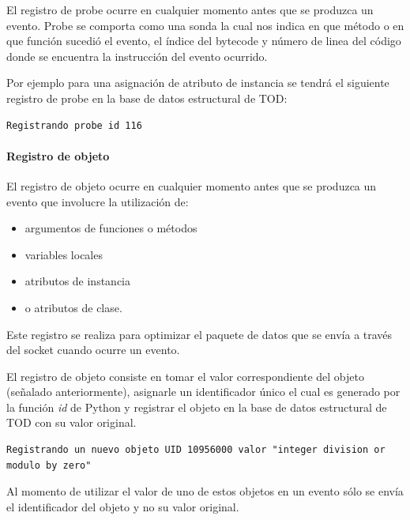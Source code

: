\documentclass[12pt,legalpaper]{report}
\begin{document}
El registro de probe ocurre en cualquier momento antes que se produzca un evento.  Probe se comporta como una sonda la cual nos indica en que método o en que función sucedió el evento, el índice del bytecode y número de linea del código donde se encuentra la instrucción del evento ocurrido.

Por ejemplo para una asignación de atributo de instancia se tendrá el siguiente registro de probe en la base de datos estructural de TOD:

\begin{singlespace}
\begin{lstlisting}[style=consola,numbers=none]
Registrando probe id 116
\end{lstlisting}
\end{singlespace}

				\paragraph{Registro de objeto}
				
El registro de objeto ocurre en cualquier momento antes que se produzca un evento que involucre la utilización de:
\begin{itemize}
	\item argumentos de funciones o métodos
	\item variables locales
	\item atributos de instancia
	\item o atributos de clase.  
\end{itemize}

Este registro se realiza para optimizar el paquete de datos que se envía a través del socket cuando ocurre un evento.

El registro de objeto consiste en tomar el valor correspondiente del objeto (señalado anteriormente), asignarle un identificador único el cual es generado por la función \textit{id} de Python y registrar el objeto en la base de datos estructural de TOD con su valor original.

\begin{singlespace}
\begin{lstlisting}[style=consola,numbers=none]
Registrando un nuevo objeto UID 10956000 valor "integer division or modulo by zero"
\end{lstlisting}
\end{singlespace}

Al momento de utilizar el valor de uno de estos objetos en un evento sólo se envía el identificador del objeto y no su valor original.
\end{document}
